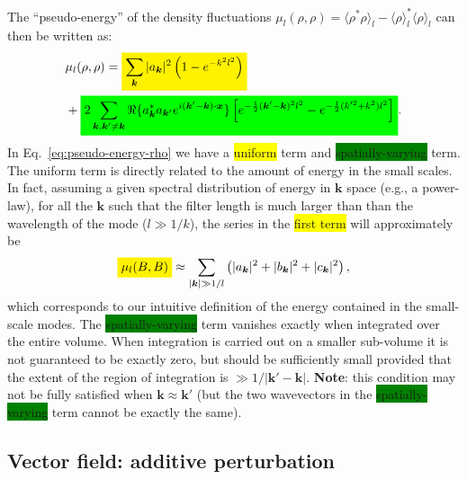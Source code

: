 \documentclass[]{article}
\newcommand{\mathcolorbox}[2]{\colorbox{#1}{$\displaystyle #2$}}
\newcommand{\bcdot}{\bm{\cdot}}
\begin{document}
%
The ``pseudo-energy'' of the density fluctuations $\mu_l(\rho,\rho) = \langle \rho^* \rho \rangle_l - \langle \rho \rangle_l^* \langle \rho \rangle_l$ can then be written as:
%
\begin{align}\label{eq:pseudo-energy-rho}
	&\mu_l(\rho,\rho) =  \mathcolorbox{yellow}{\sum_{\bm k} |a_{\bm k}|^2 \left( 1 -  e^{- k^2 l^2} \right)} \nonumber \\
	& + \mathcolorbox{green}{2 \sum_{\bm k, \bm k' \neq \bm k} \Re \lbrace a_{\bm k}^* a_{\bm k'} e^{i (\bm k' - \bm k) \bcdot\bm x } \rbrace \left[ e^{-\frac{1}{2} (\bm k' - \bm k)^2 l^2} - e^{-\frac{1}{2} (k'^2 + k^2) l^2}\right]} .
\end{align}
%
In Eq.~\eqref{eq:pseudo-energy-rho} we have a \colorbox{yellow}{uniform} term and \colorbox{green}{spatially-varying} term. The uniform term is directly related to the amount of energy in the small scales. In fact, assuming a given spectral distribution of energy in $\bm k$ space (e.g., a power-law), 
for all the $\bm k$ such that the filter length is much larger than than  the wavelength of the mode ($l \gg 1/k$), the series in the \colorbox{yellow}{first term} will approximately be
%
\begin{align}
	\mathcolorbox{yellow}{\mu_l(B,B)} \approx \sum_{|\bm k| \gg 1/l} \left( |a_{\bm k}|^2 + |b_{\bm k}|^2 + |c_{\bm k}|^2 \right),
\end{align}
%
which corresponds to our intuitive definition of the energy contained in the small-scale modes. The \colorbox{green}{spatially-varying} term vanishes exactly when integrated over the entire volume. When integration is carried out on a smaller sub-volume it is not guaranteed to be exactly zero, but should be sufficiently small provided that the extent of the region of integration is $\gg 1/| \bm k' - \bm k|$. \textbf{Note}: this condition may not be fully satisfied when $\bm k \approx \bm k'$ (but the two wavevectors in the \colorbox{green}{spatially-varying} term cannot be exactly the same).

\subsection{Vector field: additive perturbation}
\end{document}
